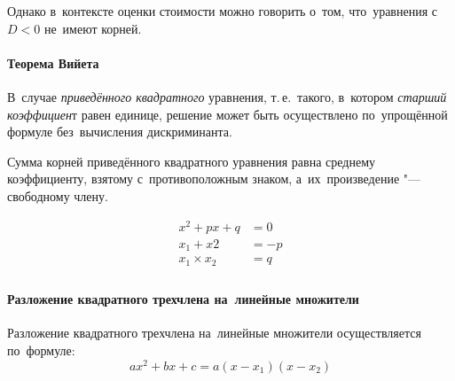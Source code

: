 \documentclass[]{scrartcl}
\begin{document}
Однако в~контексте оценки стоимости можно говорить о~том, что~уравнения с~$D<0$ не~имеют корней.

\paragraph{Теорема Вийета}
В~случае \emph{приведённого квадратного} уравнения, т.\,е.~такого, в~котором \emph{старший коэффициен}т равен единице, решение может быть осуществлено по~упрощённой формуле без~вычисления дискриминанта. 
\begin{theorem}
	Сумма корней приведённого квадратного уравнения равна среднему коэффициенту, взятому с~противоположным знаком, а~их~произведение "--- свободному члену.
\end{theorem}
\begin{equation}\label{Wijet}
\begin{aligned}
x^2+px+q&=0\\
x_1+x2&=-p\\
x_1 \times x_2 &= q\\
\end{aligned}
\end{equation}

\paragraph{Разложение квадратного трехчлена на~линейные множители}
Разложение квадратного трехчлена на~линейные множители осуществляется по~формуле:
\begin{equation}\label{eq:square-polynom-decomposition}
ax^2+bx+c=a(x-x_1)(x-x_2)
\end{equation}
\end{document}
